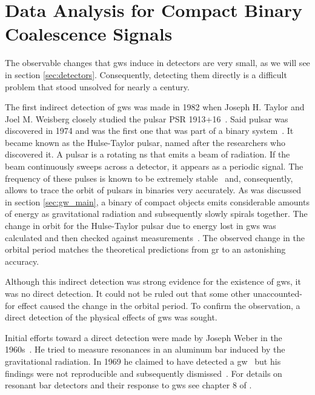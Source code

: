 \section{Data Analysis for Compact Binary Coalescence Signals}\label{sec:cbc_searches}
The observable changes that \acrshort{gw}s induce in detectors are very small, as we will see in section \ref{sec:detectors}. Consequently, detecting them directly is a difficult problem that stood unsolved for nearly a century.

The first indirect detection of \acrshort{gw}s was made in 1982 when Joseph H. Taylor and Joel M. Weisberg closely studied the pulsar PSR 1913+16~\cite{Taylor:1982zz}. Said pulsar was discovered in 1974 and was the first one that was part of a binary system~\cite{Hulse:1974eb}. It became known as the Hulse-Taylor pulsar, named after the researchers who discovered it. A pulsar is a rotating \acrshort{ns} that emits a beam of radiation. If the beam continuously sweeps across a detector, it appears as a periodic signal. The frequency of these pulses is known to be extremely stable~\cite{Matsakis:1997aaa, Verbiest:2009aaa} and, consequently, allows to trace the orbit of pulsars in binaries very accurately. As was discussed in section \ref{sec:gw_main}, a binary of compact objects emits considerable amounts of energy as gravitational radiation and subsequently slowly spirals together. The change in orbit for the Hulse-Taylor pulsar due to energy lost in \acrshort{gw}s was calculated and then checked against measurements~\cite{Taylor:1982zz, Weisberg:2004hi}. The observed change in the orbital period matches the theoretical predictions from \acrshort{gr} to an astonishing accuracy.

Although this indirect detection was strong evidence for the existence of \acrshort{gw}s, it was no direct detection. It could not be ruled out that some other unaccounted-for effect caused the change in the orbital period. To confirm the observation, a direct detection of the physical effects of \acrshort{gw}s was sought.

Initial efforts toward a direct detection were made by Joseph Weber in the 1960s~\cite{Maggiore:2008aaa, Weber:1960zz}. %
He tried to measure resonances in an aluminum bar induced by the gravitational radiation. In 1969 he claimed to have detected a \acrshort{gw}~\cite{Weber:1968llz, Weber:1969bz} but his findings were not reproducible and subsequently dismissed~\cite{Pitkin:2011yk}. %
For details on resonant bar detectors and their response to \acrshort{gw}s see chapter 8 of \cite{Maggiore:2008aaa}.

